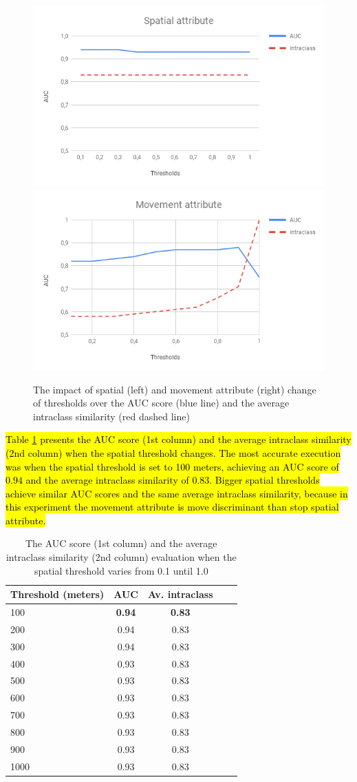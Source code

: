 \documentclass[12pt]{article}
\begin{document}
\begin{figure}[ht!]
\centerline{
\centering
\includegraphics[width=.55\textwidth]{Images/StopMove_Spatial_attribute.png}
\includegraphics[width=.55\textwidth]{Images/StopMove_Movement_attribute.png}
}
\caption{The impact of spatial (left) and movement attribute (right) change of thresholds over the AUC score (blue line) and the average intraclass similarity (red dashed line)}
\label{fig:sensibility_thresholds}
\end{figure}

\hl{Table {\ref{tab:sensibility_spatial_thresholds}} presents the AUC score (1st column) and the average intraclass similarity (2nd column) when the spatial threshold changes. The most accurate execution was when the spatial threshold is set to 100 meters, achieving an AUC score of $0.94$ and the average intraclass similarity of $0.83$. Bigger spatial thresholds achieve similar AUC scores and the same average intraclass similarity, because in this experiment the movement attribute is move discriminant than stop spatial attribute.}

\begin{table}[ht!]
  \scriptsize
  \centering
  \begin{tabular}{|l|c|c|c|c|}
  	\hline
Threshold (meters) & AUC & Av. intraclass\\
  	\hline
100 & \textbf{0.94} & \textbf{0.83}\\
200 & 0.94 & 0.83\\
300 & 0.94 & 0.83\\
400 & 0.93 & 0.83\\
500 & 0.93 & 0.83\\
600 & 0.93 & 0.83\\
700 & 0.93 & 0.83\\
800 & 0.93 & 0.83\\
900 & 0.93 & 0.83\\
1000 & 0.93 & 0.83\\
    \hline
  \end{tabular}
  \caption{The AUC score (1st column) and the average intraclass similarity (2nd column) evaluation when the spatial threshold varies from 0.1 until 1.0}
  \label{tab:sensibility_spatial_thresholds}
\end{table}
\end{document}
